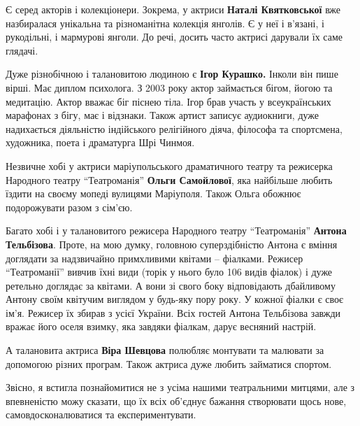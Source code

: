 Є серед акторів і колекціонери. Зокрема, у актриси \textbf{Наталі Квятковської} вже
назбиралася унікальна та різноманітна колекція янголів. Є у неї і в'язані, і
рукодільні, і мармурові янголи. До речі, досить часто актрисі дарували їх саме
глядачі.


Дуже різнобічною і талановитою людиною є \textbf{Ігор Курашко.} Інколи він пише вірші.
Має диплом психолога. З 2003 року актор займається бігом, йогою та медитацію.
Актор вважає біг піснею тіла. Ігор брав участь у всеукраїнських марафонах з
бігу, має і відзнаки. Також артист записує аудиокниги, дуже надихається
діяльністю індійського релігійного діяча, філософа та спортсмена, художника,
поета і драматурга Шрі Чинмоя.


Незвичне хобі у актриси маріупольського драматичного театру та режисерка
Народного театру \enquote{Театроманія} \textbf{Ольги Самойлової}, яка найбільше любить  їздити
на своєму мопеді вулицями Маріуполя. Також Ольга обожнює подорожувати разом з
сім'єю.


Багато хобі і у талановитого режисера Народного театру \enquote{Театроманія} \textbf{Антона
Тельбізова}. Проте, на мою думку, головною суперздібністю Антона є вміння
доглядати за надзвичайно примхливими квітами – фіалками. Режисер \enquote{Театроманії}
вивчив їхні види (торік у нього було 106 видів фіалок)  і дуже ретельно
доглядає за квітами. А вони зі свого боку відповідають дбайливому Антону своїм
квітучим виглядом у будь-яку пору року. У кожної фіалки є своє ім'я. Режисер їх
збирав з усієї України. Всіх гостей Антона Тельбізова завжди вражає його оселя
взимку, яка завдяки фіалкам, дарує весняний настрій.


А талановита актриса \textbf{Віра Шевцова} полюбляє монтувати та малювати за допомогою
різних програм. Також актриса дуже любить займатися спортом.

Звісно, я встигла познайомитися не з усіма нашими театральними митцями, але з
впевненістю можу сказати, що їх всіх об'єднує бажання створювати щось нове,
самовдосконалюватися та експериментувати.
